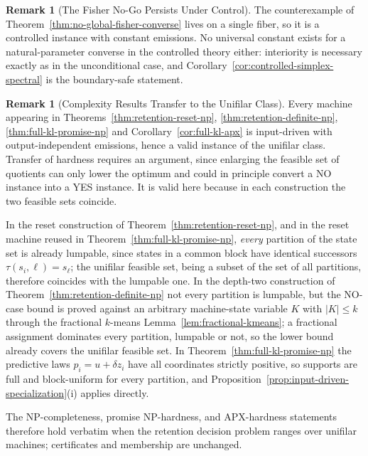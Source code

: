 \documentclass[12pt]{article}
\theoremstyle{definition}
\newtheorem{remark}[theorem]{Remark}
\begin{document}
\begin{remark}[The Fisher No-Go Persists Under Control]
\label{rem:controlled-fisher-nogo}
The counterexample of Theorem~\ref{thm:no-global-fisher-converse} lives on a
single fiber, so it is a controlled instance with constant emissions.  No
universal constant exists for a natural-parameter converse in the controlled
theory either: interiority is necessary exactly as in the unconditional case,
and Corollary~\ref{cor:controlled-simplex-spectral} is the boundary-safe
statement.
\end{remark}

\begin{remark}[Complexity Results Transfer to the Unifilar Class]
\label{rem:complexity-transfer}
Every machine appearing in Theorems~\ref{thm:retention-reset-np},
\ref{thm:retention-definite-np}, \ref{thm:full-kl-promise-np} and
Corollary~\ref{cor:full-kl-apx} is input-driven with output-independent
emissions, hence a valid instance of the unifilar class.  Transfer of hardness
requires an argument, since enlarging the feasible set of quotients can only
lower the optimum and could in principle convert a NO instance into a YES
instance.  It is valid here because in each construction the two feasible sets
coincide.

In the reset construction of Theorem~\ref{thm:retention-reset-np}, and in the
reset machine reused in Theorem~\ref{thm:full-kl-promise-np}, \emph{every}
partition of the state set is already lumpable, since states in a common block
have identical successors $\tau(s_i,\ell)=s_\ell$; the unifilar feasible set,
being a subset of the set of all partitions, therefore coincides with the
lumpable one.  In the depth-two construction of
Theorem~\ref{thm:retention-definite-np} not every partition is lumpable, but
the NO-case bound is proved against an arbitrary machine-state variable $K$
with $|K|\le k$ through the fractional $k$-means Lemma~\ref{lem:fractional-kmeans};
a fractional assignment dominates every partition, lumpable or not, so the
lower bound already covers the unifilar feasible set.  In
Theorem~\ref{thm:full-kl-promise-np} the predictive laws $p_i=u+\delta z_i$
have all coordinates strictly positive, so supports are full and block-uniform
for every partition, and Proposition~\ref{prop:input-driven-specialization}(i)
applies directly.

The NP-completeness, promise NP-hardness, and APX-hardness statements therefore
hold verbatim when the retention decision problem ranges over unifilar
machines; certificates and membership are unchanged.
\end{remark}
\end{document}
